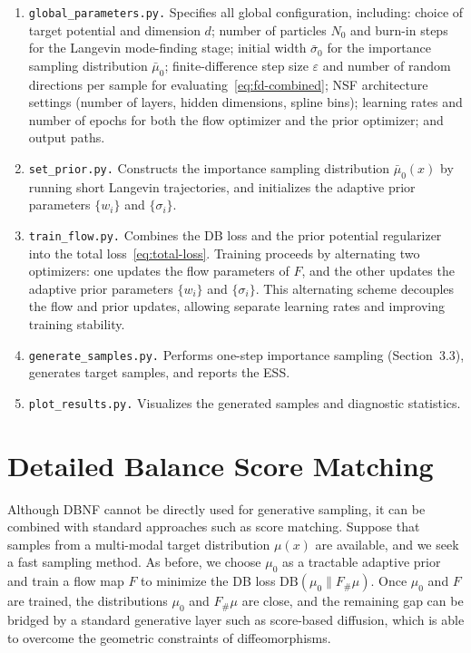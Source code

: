 \documentclass{article}
\newcommand{\DB}{\mathrm{DB}}
\theoremstyle{plain}
\begin{document}
\begin{enumerate}
    \item \texttt{global\_parameters.py.} Specifies all global configuration, including: choice of target potential and dimension $d$; number of particles $N_0$ and burn-in steps for the Langevin mode-finding stage; initial width $\bar\sigma_0$ for the importance sampling distribution $\bar\mu_0$; finite-difference step size $\varepsilon$ and number of random directions per sample for evaluating~\eqref{eq:fd-combined}; NSF architecture settings (number of layers, hidden dimensions, spline bins); learning rates and number of epochs for both the flow optimizer and the prior optimizer; and output paths.
    \item \texttt{set\_prior.py.} Constructs the importance sampling distribution $\bar \mu_0(x)$ by running short Langevin trajectories, and initializes the adaptive prior parameters $\{w_i\}$ and $\{\sigma_i\}$.
    \item \texttt{train\_flow.py.} Combines the DB loss and the prior potential regularizer into the total loss~\eqref{eq:total-loss}. Training proceeds by alternating two optimizers: one updates the flow parameters of $F$, and the other updates the adaptive prior parameters $\{w_i\}$ and $\{\sigma_i\}$. This alternating scheme decouples the flow and prior updates, allowing separate learning rates and improving training stability.
    \item \texttt{generate\_samples.py.} Performs one-step importance sampling (Section~3.3), generates target samples, and reports the ESS.
    \item \texttt{plot\_results.py.} Visualizes the generated samples and diagnostic statistics.
\end{enumerate}

\section{Detailed Balance Score Matching}

Although DBNF cannot be directly used for generative sampling, it can be combined with standard approaches such as score matching. Suppose that samples from a multi-modal target distribution $\mu(x)$ are available, and we seek a fast sampling method. As before, we choose $\mu_0$ as a tractable adaptive prior and train a flow map $F$ to minimize the DB loss $\DB(\mu_0\|F_{\#}\mu)$. Once $\mu_0$ and $F$ are trained, the distributions $\mu_0$ and $F_{\#}\mu$ are close, and the remaining gap can be bridged by a standard generative layer such as score-based diffusion, which is able to overcome the geometric constraints of diffeomorphisms.
\end{document}
